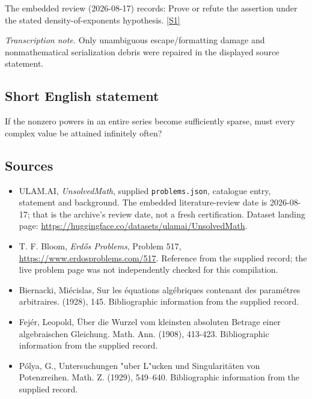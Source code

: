 \documentclass[11pt,a4paper]{article}
\newcommand{\sref}[2]{\hyperlink{source:#1:#2}{[S#2]}}
\begin{document}
The embedded review (2026-08-17) records: Prove or refute the assertion under the stated density-of-exponents hypothesis. \sref{statement}{1}

{\small\emph{Transcription note.} Only unambiguous escape/formatting damage and nonmathematical serialization debris were repaired in the displayed source statement.}

\subsection{Short English statement}

If the nonzero powers in an entire series become sufficiently sparse, must every complex value be attained infinitely often?

\subsection{Sources}

{\small

\begin{itemize}

\item[\hypertarget{source:statement:1}{S1}] ULAM.AI, \emph{UnsolvedMath}, supplied \texttt{problems.json}, catalogue entry, statement and background. The embedded literature-review date is 2026-08-17; that is the archive’s review date, not a fresh certification. Dataset landing page: \url{https://huggingface.co/datasets/ulamai/UnsolvedMath}.

\item[\hypertarget{source:statement:2}{S2}] T. F. Bloom, \emph{Erdős Problems}, Problem 517, \url{https://www.erdosproblems.com/517}. Reference from the supplied record; the live problem page was not independently checked for this compilation.

\item[\hypertarget{source:statement:3}{S3}] Biernacki, Mi\'{e}cislas, Sur les \'{e}quations alg\'{e}briques contenant des param\'{e}tres arbitraires. (1928), 145. Bibliographic information from the supplied record.

\item[\hypertarget{source:statement:4}{S4}] Fej\'{e}r, Leopold, \"{U}ber die Wurzel vom kleinsten absoluten Betrage einer algebraischen Gleichung. Math. Ann. (1908), 413-423. Bibliographic information from the supplied record.

\item[\hypertarget{source:statement:5}{S5}] P\'olya, G., Untersuchungen "uber {L}"ucken und {S}ingularit\"{a}ten von {P}otenzreihen. Math. Z. (1929), 549--640. Bibliographic information from the supplied record.

\end{itemize}

}

\label{end:statement}
\end{document}
